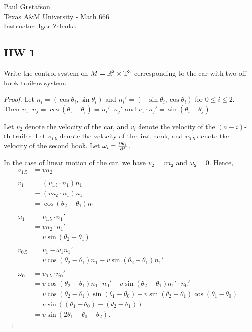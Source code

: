 \documentclass{article}
\begin{document}
\noindent Paul Gustafson\\
\noindent Texas A\&M University - Math 666\\ 
\noindent Instructor: Igor Zelenko

\subsection*{HW 1}
  Write the control system on $M = \R^2 \times \mathbb{T}^3$ corresponding to the car with two off-hook trailers system.
\begin{proof}
Let $n_i = (\cos \theta_i, \sin \theta_i)$ and $n_i' = (-\sin \theta_i , \cos \theta_i)$ for $0 \le i \le 2$.
Then $n_i \cdot n_j  = \cos(\theta_i - \theta_j) = n_i' \cdot n_j'$ and $n_i \cdot n_j' = \sin(\theta_i - \theta_j)$.

Let $v_2$ denote the velocity of the car, and $v_i$ denote the velocity of the $(n-i)$-th trailer. Let $v_{1.5}$ denote the velocity of the first hook, and $v_{0.5}$ denote the velocity of the second hook. Let $\omega_i = \pder[\theta_i]{t}$.  


In the case of linear motion of the car, we have $v_2 = v n_2$ and $\omega_2 = 0$. Hence,
\begin{align*}
v_{1.5} & = v n_2
\\
\\ v_1 & = (v_{1.5} \cdot n_1) n_1 
\\ & = (v n_2 \cdot n_1) n_1 
\\ & = \cos(\theta_2 - \theta_1) n_1
\\
\\ \omega_1 & = v_{1.5} \cdot n_1' 
\\ & = v n_2 \cdot n_1' 
\\ & = v \sin(\theta_2 - \theta_1)
\\
\\ v_{0.5} & = v_1  - \omega_1 n_1' 
\\ & = v \cos(\theta_2 - \theta_1) n_1 - v \sin(\theta_2 - \theta_1) n_1'
\\
\\ \omega_0 & = v_{0.5} \cdot n_0'
\\ & = v \cos(\theta_2 - \theta_1) n_1 \cdot n_0' - v \sin(\theta_2 - \theta_1) n_1' \cdot n_0'
\\ &  = v \cos(\theta_2 - \theta_1) \sin(\theta_1 - \theta_0) - v \sin(\theta_2 - \theta_1) \cos(\theta_1 - \theta_0)
\\ &  = v \sin((\theta_1 - \theta_0) - (\theta_2 - \theta_1))
\\ &  = v \sin(2 \theta_1 - \theta_0 - \theta_2 ).
\end{align*}


\end{proof}
\end{document}
